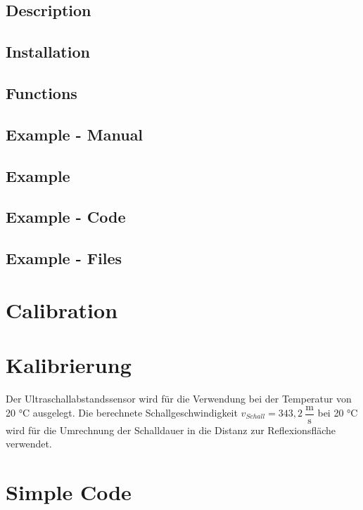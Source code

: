 \subsection{Description}


\subsection{Installation}

\subsection{Functions}

\subsection{Example - Manual}

\subsection{Example}

\subsection{Example - Code}

\subsection{Example - Files}



\section{Calibration}

\section{Kalibrierung}
Der Ultraschallabstandssensor wird für die Verwendung bei der Temperatur von 20 °C ausgelegt. Die  berechnete Schallgeschwindigkeit $v_{Schall}=343,2\:\dfrac{\text{m}}{\text{s}}$ bei 20 °C wird für die Umrechnung der Schalldauer in die Distanz zur Reflexionsfläche verwendet.



\section{Simple Code}

